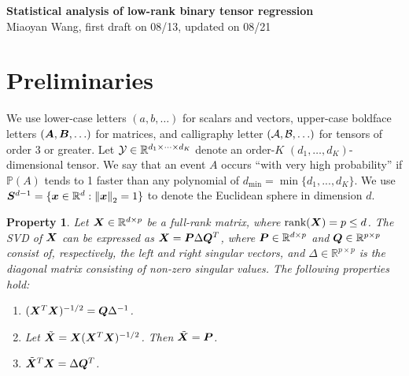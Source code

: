 \documentclass[11pt]{article}
\theoremstyle{plain}
\newtheorem{pro}{Property}
\theoremstyle{definition}
\begin{document}
\begin{center}
{\bf \large Statistical analysis of low-rank binary tensor regression}\\
Miaoyan Wang, first draft on 08/13, updated on 08/21
\end{center}

\section{Preliminaries}


We use lower-case letters $(a, b, \ldots)$ for scalars and vectors, upper-case boldface letters $(\bm A, \bm B, \ldots)$ for matrices, and calligraphy letter $(\mathcal{A},\mathcal{B},\ldots)$ for tensors of order 3 or greater. Let $\mathcal{Y} \in \mathbb{R}^{d_1\times \cdots \times d_K}$ denote an order-$K$ $(d_1,\ldots,d_K)$-dimensional tensor. We say that an event $A$ occurs ``with very high probability'' if $\mathbb{P}(A)$ tends to 1 faster than any polynomial of $d_{\min}=\min\{d_1, . . . , d_K\}$. We use $\bm S^{d-1}=\{\bm x\in\mathbb{R}^d: \left\lVert\bm x\right\rVert_2=1\}$ to denote the Euclidean sphere in dimension $d$.\\


\begin{pro}\label{eq:defn}
Let $\bm X\in\mathbb{R}^{d\times p}$ be a full-rank matrix, where $\text{rank}(\bm X)=p\leq d$. The SVD of $\bm X$ can be expressed as $\bm X=\bm{P}\Delta\bm{Q}^T$, where $\bm{P}\in\mathbb{R}^{d\times p}$ and $\bm{Q}\in\mathbb{R}^{p\times p}$ consist of, respectively, the left and right singular vectors, and $\Delta\in\mathbb{R}^{p\times p}$ is the diagonal matrix consisting of non-zero singular values. The following properties hold:
\begin{enumerate}
\item $(\bm X^T\bm X)^{-1/2}=\bm{Q}\Delta^{-1}$.
\item Let $\tilde {\bm X}=\bm X(\bm X^T\bm X)^{-1/2}$. Then $\tilde {\bm X}=\bm{P}$.
\item $\tilde {\bm X}^T\bm X=\Delta\bm{Q}^T$.
\end{enumerate}
\end{pro}
\end{document}
